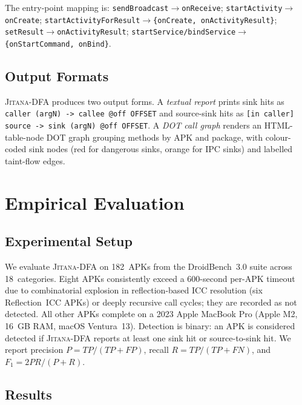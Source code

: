 \documentclass[conference]{IEEEtran}
\begin{document}
The entry-point mapping is: \texttt{sendBroadcast}$\to$\texttt{onReceive};
\texttt{startActivity}$\to$\texttt{onCreate};
\texttt{startActivityForResult}$\to$\texttt{\{onCreate, onActivityResult\}};
\texttt{setResult}$\to$\texttt{onActivityResult};
\texttt{startService/bindService}$\to$\texttt{\{onStartCommand, onBind\}}.

\subsection{Output Formats}

\textsc{Jitana-DFA} produces two output forms. A \emph{textual report} prints
sink hits as \texttt{caller (argN) -> callee @off OFFSET} and source-sink hits
as \texttt{[in caller] source -> sink (argN) @off OFFSET}. A \emph{DOT call
graph} renders an HTML-table-node DOT graph grouping methods by APK and package,
with colour-coded sink nodes (red for dangerous sinks, orange for IPC sinks) and
labelled taint-flow edges.

\section{Empirical Evaluation}

\subsection{Experimental Setup}

We evaluate \textsc{Jitana-DFA} on 182~APKs from the DroidBench~3.0 suite
across 18~categories. Eight APKs consistently exceed a 600-second per-APK
timeout due to combinatorial explosion in reflection-based ICC resolution (six
Reflection~ICC APKs) or deeply recursive call cycles; they are recorded as not
detected. All other APKs complete on a 2023 Apple MacBook Pro (Apple M2, 16~GB
RAM, macOS Ventura~13). Detection is binary: an APK is considered detected if
\textsc{Jitana-DFA} reports at least one sink hit or source-to-sink hit. We
report precision $P = \mathit{TP}/(\mathit{TP}+\mathit{FP})$, recall $R =
\mathit{TP}/(\mathit{TP}+\mathit{FN})$, and $F_1 = 2PR/(P+R)$.

\subsection{Results}
\end{document}
